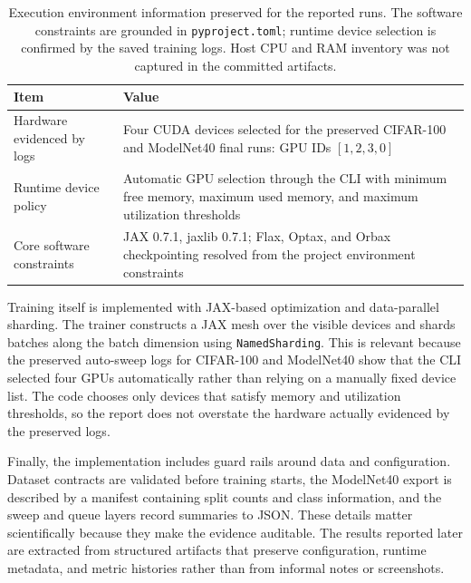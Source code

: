 \begin{table}[t]
  \centering
  \caption{Execution environment information preserved for the reported runs. The software constraints are grounded in \texttt{pyproject.toml}; runtime device selection is confirmed by the saved training logs. Host CPU and RAM inventory was not captured in the committed artifacts.}
  \label{tab:environment}
  \begin{tabularx}{\linewidth}{@{}lY@{}}
    \toprule
    \textbf{Item} & \textbf{Value} \\
    \midrule
    Hardware evidenced by logs & Four CUDA devices selected for the preserved CIFAR-100 and ModelNet40 final runs: GPU IDs \([1,2,3,0]\) \\
    Runtime device policy & Automatic GPU selection through the CLI with minimum free memory, maximum used memory, and maximum utilization thresholds \\
    Core software constraints & JAX 0.7.1, jaxlib 0.7.1; Flax, Optax, and Orbax checkpointing resolved from the project environment constraints \\
    \bottomrule
  \end{tabularx}
\end{table}

Training itself is implemented with JAX-based optimization and data-parallel sharding. The trainer constructs a JAX mesh over the visible devices and shards batches along the batch dimension using \texttt{NamedSharding}. This is relevant because the preserved auto-sweep logs for CIFAR-100 and ModelNet40 show that the CLI selected four GPUs automatically rather than relying on a manually fixed device list. The code chooses only devices that satisfy memory and utilization thresholds, so the report does not overstate the hardware actually evidenced by the preserved logs.

Finally, the implementation includes guard rails around data and configuration. Dataset contracts are validated before training starts, the ModelNet40 export is described by a manifest containing split counts and class information, and the sweep and queue layers record summaries to JSON. These details matter scientifically because they make the evidence auditable. The results reported later are extracted from structured artifacts that preserve configuration, runtime metadata, and metric histories rather than from informal notes or screenshots.
